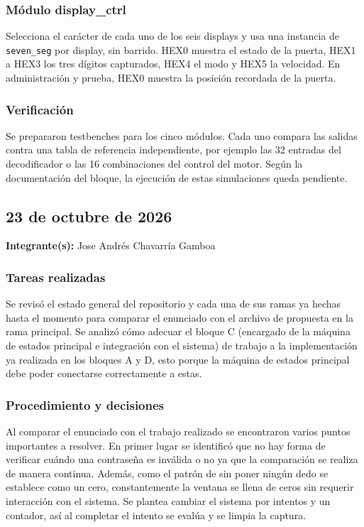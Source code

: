 \documentclass[11pt,letterpaper]{article}
\newcommand{\entrada}[2]{%
  \subsection*{#1}%
  \addcontentsline{toc}{subsection}{#1}%
  \noindent\textbf{Integrante(s):} #2\par\medskip
}
\begin{document}
\subsubsection*{Módulo display\_ctrl}

Selecciona el carácter de cada uno de los seis displays y usa una instancia de \texttt{seven\_seg} por display, sin barrido. HEX0 muestra el estado de la puerta, HEX1 a HEX3 los tres dígitos capturados, HEX4 el modo y HEX5 la velocidad. En administración y prueba, HEX0 muestra la posición recordada de la puerta.

\subsubsection*{Verificación}

Se prepararon testbenches para los cinco módulos. Cada uno compara las salidas contra una tabla de referencia independiente, por ejemplo las 32 entradas del decodificador o las 16 combinaciones del control del motor. Según la documentación del bloque, la ejecución de estas simulaciones queda pendiente.

\entrada{23 de octubre de 2026}{Jose Andrés Chavarría Gamboa}
\subsubsection*{Tareas realizadas}
Se revisó el estado general del repositorio y cada una de sus ramas ya hechas hasta el momento para comparar el enunciado con el archivo de propuesta en la rama principal. Se analizó cómo adecuar el bloque C (encargado de la máquina de estados principal e integración con el sistema) de trabajo a la implementación ya realizada en los bloques A y D, esto porque la máquina de estados principal debe poder conectarse correctamente a estas.

\subsubsection*{Procedimiento y decisiones}
Al comparar el enunciado con el trabajo realizado se encontraron varios puntos importantes a resolver. En primer lugar se identificó que no hay forma de verificar cuándo una contraseña es inválida o no ya que la comparación se realiza de manera continua. Además, como el patrón de sin poner ningún dedo se establece como un cero, constantemente la ventana se llena de ceros sin requerir interacción con el sistema. Se plantea cambiar el sistema por intentos y un contador, así al completar el intento se evalúa y se limpia la captura.
\end{document}
